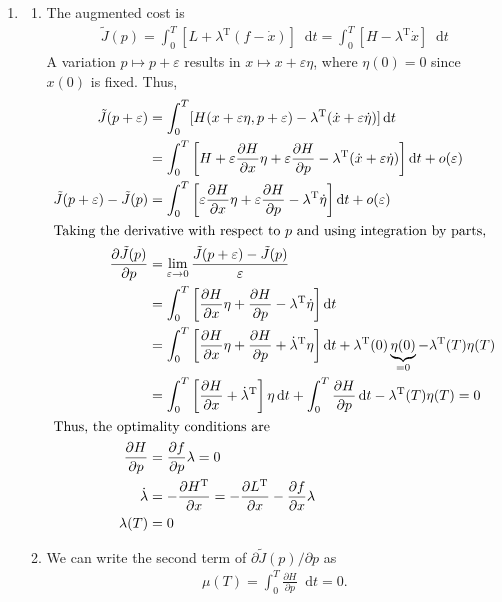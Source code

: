 \documentclass[letterpaper,11pt,titlepage]{article}
\newcommand*\dif{\mathop{}\!\mathrm{d}}
\newcommand{\trans}{^\text{T}}
\newcommand*\pder[2]{\frac{\partial #1}{\partial #2}}
\begin{document}
\begin{enumerate}[leftmargin=0pt]
\item \begin{enumerate}
  \item The augmented cost is
    \begin{gather}
      \tilde J(p) = \int_0^T [L + \lambda\trans(f-\dot x)] \dif t = \int_0^T [H - \lambda\trans \dot x] \dif t
    \end{gather}
    A variation $p\mapsto p + \varepsilon$ results in $x\mapsto x+\varepsilon\eta$, where $\eta(0)=0$ since $x(0)$ is fixed. Thus,
    \begin{align}
      \tilde J(p+\varepsilon) &= \int_0^T [H(x+\varepsilon\eta,p+\varepsilon) - \lambda\trans (\dot x + \varepsilon\dot\eta)] \dif t \\
                              &= \int_0^T \left[H + \varepsilon\pder{H}{x}\eta + \varepsilon\pder{H}{p} - \lambda\trans (\dot x + \varepsilon\dot\eta)\right] \dif t + o(\varepsilon) \\
      \tilde J(p+\varepsilon) - \tilde J(p) &= \int_0^T \left[ \varepsilon\pder{H}{x}\eta + \varepsilon\pder{H}{p} - \lambda\trans \dot\eta \right] \dif t + o(\varepsilon) \\
      \intertext{Taking the derivative with respect to $p$ and using integration by parts,}
      \pder{\tilde J(p)}{p} &= \lim_{\varepsilon\to0} \frac{\tilde J(p+\varepsilon) - \tilde J(p)}{\varepsilon} \\
                              &= \int_0^T \left[ \pder{H}{x}\eta + \pder{H}{p} - \lambda\trans \dot\eta \right] \dif t \\
                              &= \int_0^T \left[ \pder{H}{x}\eta + \pder{H}{p} + \dot\lambda\trans \eta \right] \dif t + \lambda\trans(0) \underbrace{\eta(0)}_{=0} - \lambda\trans(T)\eta(T) \\
                              &= \int_0^T \left[ \pder{H}{x} + \dot\lambda\trans \right] \eta \dif t + \int_0^T \pder{H}{p} \dif t - \lambda\trans(T)\eta(T) = 0 \\
      \intertext{Thus, the optimality conditions are}
      \pder{H}{p} &= \pder{f}{p} \lambda = 0 \\
      \dot \lambda &= -\pder{H\trans}{x} = -\pder{L\trans}{x} - \pder{f}{x}\lambda \\
      \lambda(T) &= 0
    \end{align}
  \item We can write the second term of $\partial\tilde J(p)/\partial p$ as
    \begin{gather}
      \mu(T) = \int_0^T \pder{H}{p} \dif t = 0.

\end{gather}
\end{enumerate}
\end{enumerate}
\end{document}
